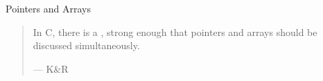 \begin{frame}{}
  \centerline{\LARGE Pointers and Arrays}

  \vspace{0.80cm}
  \begin{quote}
    In C, there is a ,
    strong enough that pointers and arrays should be discussed simultaneously.

    \hfill --- K\&R
  \end{quote}
\end{frame}




